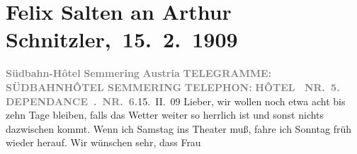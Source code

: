 

         
         \renewcommand{\erwaehntePersonen}{Personen: Felix Salten, Ottilie Salten, Olga Schnitzler}
         \renewcommand{\erwaehnteOrte}{Orte: Semmering, Südbahnhotel, Wien, Österreich}
         \renewcommand{\erwaehnteWerke}{}
               \section[ Felix Salten an Arthur Schnitzler, 15. 2. 1909]{ Felix Salten an Arthur Schnitzler, 15. 2. 1909}\nopagebreak{}\rehead{ }\begin{ledgroupsized}[t]{13cm}\normalsize\beginnumbering{} \toendnotes[C]{\smallbreak\pagebreak[2]} 
\toendnotes[C]{\smallbreak}\pstart
           \noindent{}{\pb}\textcolor{gray}{\textbf{Südbahn-Hôtel}}\pend
           \pstart
           \textcolor{gray}{\textbf{Semmering}}\pend
           \pstart
           \textcolor{gray}{\textbf{Austria}}\pend
           \pstart
           \textcolor{gray}{\textbf{\textsc{TELEGRAMME:}}}\pend
           \pstart
           \textcolor{gray}{\textbf{\textsc{SÜDBAHNHÔTEL SEMMERING}}}\pend
           \pstart
           \textcolor{gray}{\textbf{\textsc{TELEPHON:}}}\pend
           \pstart
           \textcolor{gray}{\textbf{\textsc{HÔTEL {\dotsfour} NR. 5.}}}\pend
           \pstart
           \textcolor{gray}{\textbf{\textsc{DEPENDANCE . NR. 6.}}}\hfill 15. II. 09\pend
           \pstart
           Lieber, wir wollen noch etwa acht bis zehn Tage bleiben, falls das
               Wetter weiter so herrlich ist und sonst nichts dazwischen kommt. Wenn ich Samstag ins Theater muß, fahre ich Sonntag früh wieder herauf. Wir wünschen sehr, dass Frau
                  \label{K_L03522-1v}
\end{ledgroupsized}

